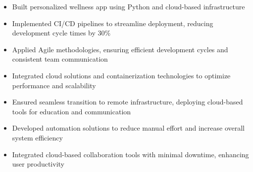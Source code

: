 \par\smallskip
\begin{minipage}{13.75cm}
  \begin{minipage}{6.5cm}
    \begin{itemize}
      \item Built personalized wellness app using Python and cloud-based infrastructure
      \item Implemented CI/CD pipelines to streamline deployment, reducing development cycle times by 30\%
    \end{itemize}
  \end{minipage}
  \hfill
  \begin{minipage}{6.5cm}
    \begin{itemize}
      \item Applied Agile methodologies, ensuring efficient development cycles and consistent team communication
      \item Integrated cloud solutions and containerization technologies to optimize performance and scalability
    \end{itemize}
  \end{minipage}
\end{minipage}
\par\smallskip
\divider

\par\smallskip
\begin{minipage}{13.75cm}
  \begin{minipage}{6.5cm}
    \begin{itemize}
      \item Ensured seamless transition to remote infrastructure, deploying cloud-based tools for education and communication
      \item Developed automation solutions to reduce manual effort and increase overall system efficiency
    \end{itemize}
  \end{minipage}
  \hfill
  \begin{minipage}{6.5cm}
    \begin{itemize}
      \item Integrated cloud-based collaboration tools with minimal downtime, enhancing user productivity
    \end{itemize}
  \end{minipage}
\end{minipage}

